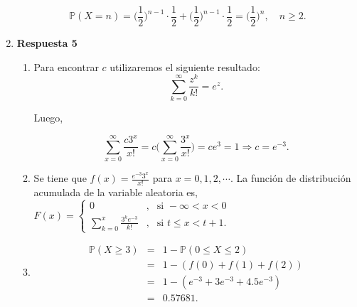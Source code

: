 \documentclass[a4paper,9pt]{report}
\begin{document}
\begin{enumerate}
\[
\mathbb{P}(X = n) = \biggl( \frac{1}{2}\biggr)^{n -1}\cdot\frac{1}{2} + \biggl( \frac{1}{2}\biggr)^{n -1}\cdot\frac{1}{2} = \biggl( \frac{1}{2}\biggr)^{n}, \quad n \geq 2.
\]


\item [] \textbf{Respuesta 5}

\begin{enumerate}
\item  Para encontrar $c$ utilizaremos el siguiente resultado:
$$\sum_{k=0}^{\infty}\frac{z^k}{k!}=e^z.$$
	
Luego, 

$$\sum_{x=0}^{\infty}\frac{c3^x}{x!}=c\bigg(\sum_{x=0}^{\infty}\frac{3^x}{x!}\bigg)=ce^3=1\Rightarrow c=e^{-3}.$$

\item Se tiene que $f(x)=\frac{e^{-3}3^x}{x!}$ para $x=0,1,2,\cdots.$ La funci\'on de distribuci\'on  acumulada de la variable aleatoria es, 
	$F(x)=\left\{\begin{matrix}
	0&,&\text{si }-\infty<x<0\\
	\displaystyle \sum_{k=0}^{x}\frac{3^ke^{-3}}{k!}&,& \text{si }t\leq x< t+1.
	\end{matrix}
	\right.$
	\item
	\begin{eqnarray*}
		\mathbb{P}(X\geq3)&=&1-\mathbb{P}(0\leq X\leq 2)\\
		&=& 1-(f(0)+f(1)+f(2))\\
		&=& 1-(e^{-3}+3e^{-3}+4.5e^{-3})\\
		&=& 0.57681.
	\end{eqnarray*}
\end{enumerate}

\end{enumerate}
\end{document}
